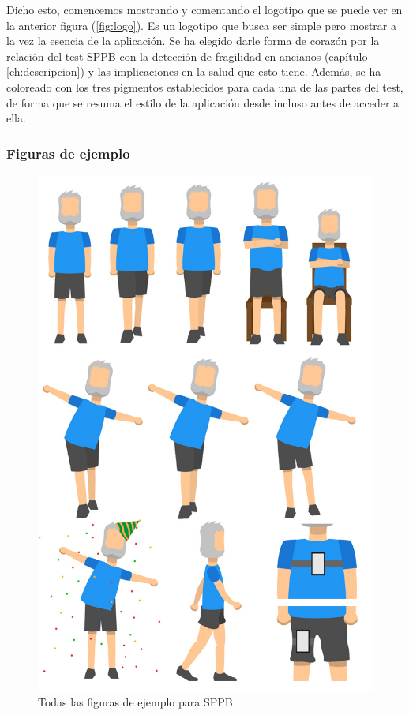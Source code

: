 Dicho esto, comencemos mostrando y comentando el logotipo que se puede ver en la anterior figura (\ref{fig:logo}). Es un logotipo que busca ser simple pero mostrar a la vez la esencia de la aplicación. Se ha elegido darle forma de corazón por la relación del test SPPB con la detección de fragilidad en ancianos (capítulo \ref{ch:descripcion}) y las implicaciones en la salud que esto tiene. Además, se ha coloreado con los tres pigmentos establecidos para cada una de las partes del test, de forma que se resuma el estilo de la aplicación desde incluso antes de acceder a ella.

\subsubsection{Figuras de ejemplo}

\begin{figure}[H]
	\centering
	\includegraphics[scale=0.43]{imagenes/figuras_ejemplo.jpg}
	\caption{Todas las figuras de ejemplo para SPPB\label{fig:figuras_ejemplo}}
\end{figure}

